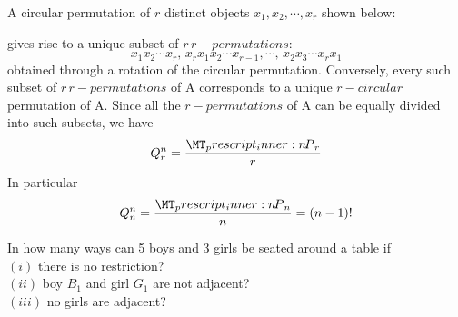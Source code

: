 \documentclass[a4paper,11pt]{book}
\newcommand\perm[2][^n]{\prescript{#1\mkern-2.5mu}{}P_{#2}}
\begin{document}
\begin{soln}
A circular permutation of $r$ distinct objects $x_1,x_2,\cdots, x_r$ shown below: 
\begin{center}
\end{center}
gives rise to a unique subset of $r\, r-permutations$: 
\[x_{1}x_{2}\cdots x_{r},\, x_{r}x_{1}x_{2}\cdots x_{r-1},\cdots,\, x_{2}x_{3}\cdots x_{r}x_{1} \]
obtained through a rotation of the circular permutation. Conversely, every such subset of $r\, r-permutations$ of A corresponds to a unique $r-circular$ permutation of A. Since all the $r-permutations$ of A can be equally divided into such subsets, we have 
\[ Q_{r}^{n} = \frac{\perm[n]{r}}{r} \]
In particular
\[ Q_{n}^{n} = \frac{\perm[n]{n}}{n} = (n-1)! \]
\end{soln}

\begin{example}
In how many ways can 5 boys and 3 girls be seated 
around a table if \\
$(i)$ there is no restriction?\\ 
$(ii)$ boy $B_1$ and girl $G_1$ are not adjacent?\\ 
$(iii)$ no girls are adjacent? 
\end{example}
\end{document}
